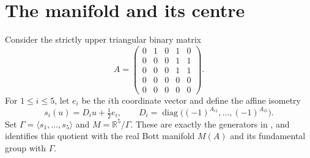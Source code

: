 \documentclass[11pt]{amsart}
\newcommand{\R}{\mathbb R}
\begin{document}
\section{The manifold and its centre}
Consider the strictly upper triangular binary matrix
\begin{equation}\label{eq:matrix}
 A=\begin{pmatrix}
 0&1&0&1&0\\
 0&0&0&1&1\\
 0&0&0&1&1\\
 0&0&0&0&0\\
 0&0&0&0&0
 \end{pmatrix}.
\end{equation}
For $1\leq i\leq5$, let $e_i$ be the $i$th coordinate vector and define
the affine isometry
\begin{equation}\label{eq:generators}
 s_i(u)=D_i u+\tfrac12 e_i,
 \qquad
 D_i=\operatorname{diag}\bigl((-1)^{A_{i1}},\ldots,(-1)^{A_{i5}}\bigr).
\end{equation}
Set $\Gamma=\langle s_1,\ldots,s_5\rangle$ and $M=\R^5/\Gamma$.
These are exactly the generators in \cite[equation~(3.1)]{KM}, and
\cite[Lemma~3.1]{KM} identifies this quotient with the real Bott manifold
$M(A)$ and its fundamental group with $\Gamma$.
\end{document}
